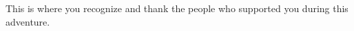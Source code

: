 \pagestyle{plain}

This is where you recognize and thank the people who supported you during this adventure.
